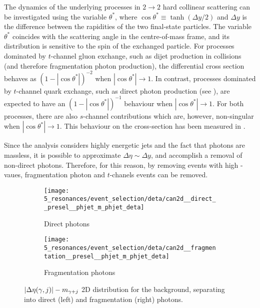 The dynamics of the underlying processes in \(2 \to 2\) hard collinear scattering can be investigated using the variable \(\theta^*\), where \(\cos\theta^* \equiv \tanh \left(\Delta y / 2\right)\) and \(\Delta y\) is the difference between the rapidities of the two final-state particles. The variable \(\theta^*\) coincides with the scattering angle in the centre-of-mass frame, and its distribution is sensitive to the spin of the exchanged particle. For processes dominated by \(t\)-channel gluon exchange, such as dijet production in \pp collisions (and therefore fragmentation photon production), the differential cross section behaves as \(\left(1 - \left|\cos \theta^*\right|\right)^{-2}\) when \(\left|\cos \theta^*\right| \to 1\). In contrast, processes dominated by \(t\)-channel quark exchange, such as direct photon production (see \Fig{\ref{fig:theory:sm:prompt_photon:feynman_lo_direct}}), are expected to have an \(\left(1 - \left|\cos \theta^*\right|\right)^{-1}\) behaviour when \(\left|\cos \theta^*\right| \to 1\). For both processes, there are also \(s\)-channel contributions which are, however, non-singular when \(\left|\cos \theta^*\right| \to 1\).
This behaviour on the cross-section has been measured in .

Since the analysis considers highly energetic jets and the fact that photons are massless, it is possible to approximate \(\Delta\eta \sim \Delta y\), and accomplish a removal of non-direct photons. Therefore, for this reason, by removing events with high \detayj-vaues, fragmentation photon and \(t\)-chanels events can be removed.

\begin{figure}[ht!]
    \centering
    \begin{subfigure}[h]{0.49\linewidth}
        \centering
        \texttt{[image: 5\_resonances/event\_selection/deta/can2d\_\_direct\_\_presel\_\_phjet\_m\_phjet\_deta]}
        \caption{Direct photons}
        \label{fig:evt_selection:sr_opt:eta:deta:2d:direct}
    \end{subfigure}
    \hfill
    \begin{subfigure}[h]{0.49\linewidth}
        \centering
        \texttt{[image: 5\_resonances/event\_selection/deta/can2d\_\_fragmentation\_\_presel\_\_phjet\_m\_phjet\_deta]}
        \caption{Fragmentation photons}
        \label{fig:evt_selection:sr_opt:eta:deta:2d:frag}
    \end{subfigure}
    \caption{\(|\Delta\eta(\gamma, j)|-m_{\gamma+j}\) 2D distribution for the \gammajet \pythia background, separating into direct (left) and fragmentation (right) photons.}
    \label{fig:evt_selection:sr_opt:eta:deta:2d}
\end{figure}


